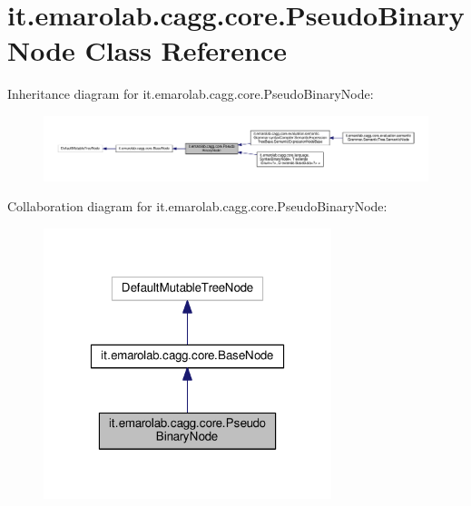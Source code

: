 \hypertarget{classit_1_1emarolab_1_1cagg_1_1core_1_1PseudoBinaryNode}{\section{it.\-emarolab.\-cagg.\-core.\-Pseudo\-Binary\-Node Class Reference}
\label{classit_1_1emarolab_1_1cagg_1_1core_1_1PseudoBinaryNode}
}


Inheritance diagram for it.\-emarolab.\-cagg.\-core.\-Pseudo\-Binary\-Node\-:\nopagebreak
\begin{figure}[H]
\begin{center}
\leavevmode
\includegraphics[width=350pt]{classit_1_1emarolab_1_1cagg_1_1core_1_1PseudoBinaryNode__inherit__graph}
\end{center}
\end{figure}


Collaboration diagram for it.\-emarolab.\-cagg.\-core.\-Pseudo\-Binary\-Node\-:\nopagebreak
\begin{figure}[H]
\begin{center}
\leavevmode
\includegraphics[width=238pt]{classit_1_1emarolab_1_1cagg_1_1core_1_1PseudoBinaryNode__coll__graph}
\end{center}
\end{figure}
